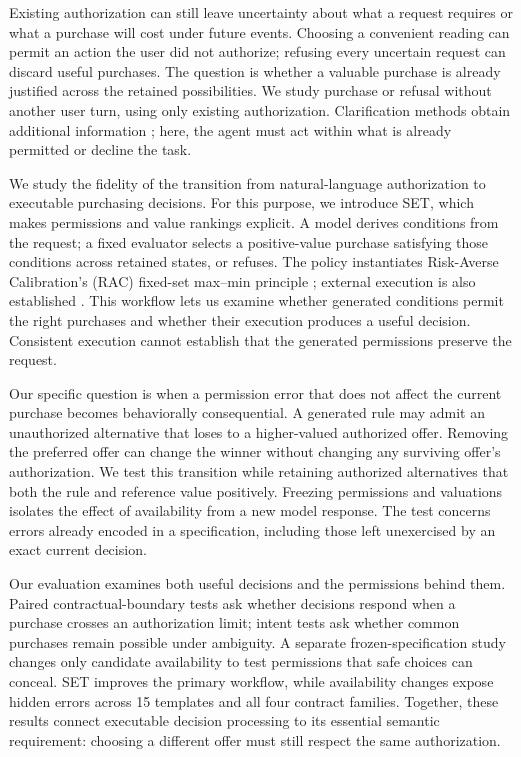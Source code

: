 \documentclass[11pt]{article}
\newcommand{\ours}{\textsc{SET}}
\begin{document}
Existing authorization can still leave uncertainty about what a request requires or what a purchase will cost under future events. Choosing a convenient reading can permit an action the user did not authorize; refusing every uncertain request can discard useful purchases. The question is whether a valuable purchase is already justified across the retained possibilities. We study purchase or refusal without another user turn, using only existing authorization. Clarification methods obtain additional information \citep{knowno,voi,sage}; here, the agent must act within what is already permitted or decline the task.

We study the fidelity of the transition from natural-language authorization to executable purchasing decisions. For this purpose, we introduce \ours, which makes permissions and value rankings explicit. A model derives conditions from the request; a fixed evaluator selects a positive-value purchase satisfying those conditions across retained states, or refuses. The policy instantiates Risk-Averse Calibration's (RAC) fixed-set max--min principle \citep{rac}; external execution is also established \citep{pal}. This workflow lets us examine whether generated conditions permit the right purchases and whether their execution produces a useful decision. Consistent execution cannot establish that the generated permissions preserve the request.

Our specific question is when a permission error that does not affect the current purchase becomes behaviorally consequential. A generated rule may admit an unauthorized alternative that loses to a higher-valued authorized offer. Removing the preferred offer can change the winner without changing any surviving offer's authorization. We test this transition while retaining authorized alternatives that both the rule and reference value positively. Freezing permissions and valuations isolates the effect of availability from a new model response. The test concerns errors already encoded in a specification, including those left unexercised by an exact current decision.

Our evaluation examines both useful decisions and the permissions behind them. Paired contractual-boundary tests ask whether decisions respond when a purchase crosses an authorization limit; intent tests ask whether common purchases remain possible under ambiguity. A separate frozen-specification study changes only candidate availability to test permissions that safe choices can conceal. SET improves the primary workflow, while availability changes expose hidden errors across 15 templates and all four contract families. Together, these results connect executable decision processing to its essential semantic requirement: choosing a different offer must still respect the same authorization.
\end{document}
